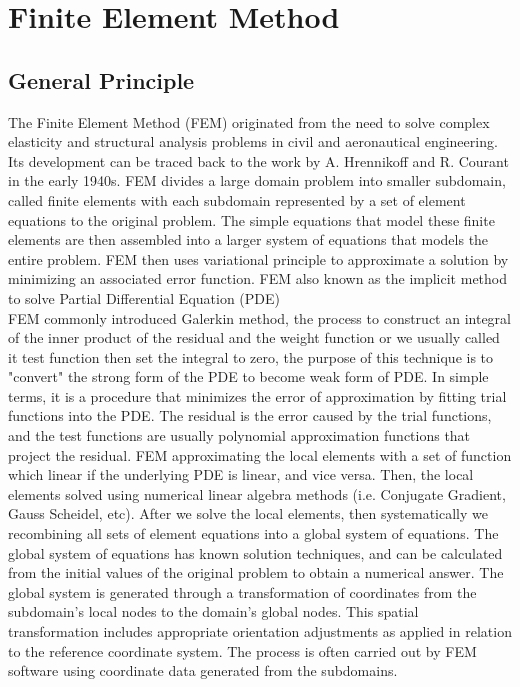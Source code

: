 \documentclass[a4paper,12pt]{article}
\begin{document}
\section{Finite Element Method}
\subsection{General Principle}
The Finite Element Method (FEM) originated from the need to solve complex elasticity and structural analysis problems in civil and aeronautical engineering. Its development can be traced back to the work by A. Hrennikoff and R. Courant in the early 1940s. FEM divides a large domain problem into smaller subdomain, called finite elements with each subdomain represented by a set of element equations to the original problem. The simple equations that model these finite elements are then assembled into a larger system of equations that models the entire problem. FEM then uses variational principle to approximate a solution by minimizing an associated error function. FEM also known as the implicit method to solve Partial Differential Equation (PDE)\\
FEM commonly introduced Galerkin method, the process to construct an integral of the inner product of the residual and the weight function or we usually called it test function then set the integral to zero, the purpose of this technique is to "convert" the strong form of the PDE to become weak form of PDE. In simple terms, it is a procedure that minimizes the error of approximation by fitting trial functions into the PDE. The residual is the error caused by the trial functions, and the test functions are usually polynomial approximation functions that project the residual. FEM approximating the local elements with a set of function which linear if the underlying PDE is linear, and vice versa. Then, the local elements solved using numerical linear algebra methods (i.e. Conjugate Gradient, Gauss Scheidel, etc). After we solve the local elements, then systematically we recombining all sets of element equations into a global system of equations. The global system of equations has known solution techniques, and can be calculated from the initial values of the original problem to obtain a numerical answer. The global system is generated through a transformation of coordinates from the subdomain's local nodes to the domain's global nodes. This spatial transformation includes appropriate orientation adjustments as applied in relation to the reference coordinate system. The process is often carried out by FEM software using coordinate data generated from the subdomains.
\end{document}
